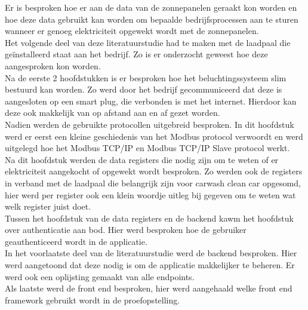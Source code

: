 Er is besproken hoe er aan de data van de zonnepanelen geraakt kon worden en hoe deze data gebruikt kan worden om bepaalde bedrijfsprocessen aan te sturen wanneer er genoeg elektriciteit opgewekt wordt met de zonnepanelen.\\

Het volgende deel van deze literatuurstudie had te maken met de laadpaal die geïnstalleerd staat aan het bedrijf. Zo is er onderzocht geweest hoe deze aangesproken kon worden.\\

Na de eerste 2 hoofdstukken is er besproken hoe het beluchtingssysteem slim bestuurd kan worden. Zo werd door het bedrijf gecommuniceerd dat deze is aangesloten op een smart plug, die verbonden is met het internet. Hierdoor kan deze ook makkelijk van op afstand aan en af gezet worden.\\

Nadien werden de gebruikte protocollen uitgebreid besproken. In dit hoofdstuk werd er eerst een kleine geschiedenis van het Modbus protocol verwoordt en werd uitgelegd hoe het Modbus TCP/IP en Modbus TCP/IP Slave protocol werkt.\\

Na dit hoofdstuk werden de data registers die nodig zijn om te weten of er elektriciteit aangekocht of opgewekt wordt besproken. Zo werden ook de registers in verband met de laadpaal die belangrijk zijn voor carwash clean car opgesomd, hier werd per register ook een klein woordje uitleg bij gegeven om te weten wat welk register juist doet.\\

Tussen het hoofdstuk van de data registers en de backend kawm het hoofdstuk over authenticatie aan bod. Hier werd besproken hoe de gebruiker geauthenticeerd wordt in de applicatie.\\

In het voorlaatste deel van de literatuurstudie werd de backend besproken. Hier werd aangetoond dat deze nodig is om de applicatie makkelijker te beheren. Er werd ook een oplijsting gemaakt van alle endpoints.\\

Als laatste werd de front end besproken, hier werd aangehaald welke front end framework gebruikt wordt in de proefopstelling.